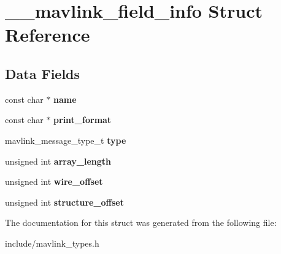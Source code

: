 \hypertarget{struct____mavlink__field__info}{}\section{\+\_\+\+\_\+mavlink\+\_\+field\+\_\+info Struct Reference}
\label{struct____mavlink__field__info}
\subsection*{Data Fields}
\begin{DoxyCompactItemize}
\item 
const char $\ast$ {\bfseries name}\hypertarget{struct____mavlink__field__info_a8f8f80d37794cde9472343e4487ba3eb}{}\label{struct____mavlink__field__info_a8f8f80d37794cde9472343e4487ba3eb}

\item 
const char $\ast$ {\bfseries print\+\_\+format}\hypertarget{struct____mavlink__field__info_ab6591f14d578c6303c865512c851b6e9}{}\label{struct____mavlink__field__info_ab6591f14d578c6303c865512c851b6e9}

\item 
mavlink\+\_\+message\+\_\+type\+\_\+t {\bfseries type}\hypertarget{struct____mavlink__field__info_ac2aee413d719723bd3b724ffc560d1a5}{}\label{struct____mavlink__field__info_ac2aee413d719723bd3b724ffc560d1a5}

\item 
unsigned int {\bfseries array\+\_\+length}\hypertarget{struct____mavlink__field__info_acc3a5ec7746f41df8d8f46f12c95c7a0}{}\label{struct____mavlink__field__info_acc3a5ec7746f41df8d8f46f12c95c7a0}

\item 
unsigned int {\bfseries wire\+\_\+offset}\hypertarget{struct____mavlink__field__info_ae250e6440e4cad05d0ae53a61341dcc5}{}\label{struct____mavlink__field__info_ae250e6440e4cad05d0ae53a61341dcc5}

\item 
unsigned int {\bfseries structure\+\_\+offset}\hypertarget{struct____mavlink__field__info_a406a37e242590a3c43691d2fffc56e7f}{}\label{struct____mavlink__field__info_a406a37e242590a3c43691d2fffc56e7f}

\end{DoxyCompactItemize}


The documentation for this struct was generated from the following file\+:\begin{DoxyCompactItemize}
\item 
include/mavlink\+\_\+types.\+h\end{DoxyCompactItemize}

